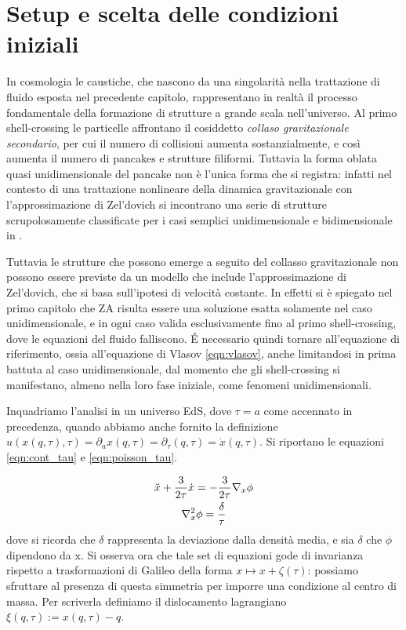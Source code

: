 \begin{comment}
    alcune idee/frasi da inserire


\end{comment}



\section{Setup e scelta delle condizioni iniziali}

In cosmologia le caustiche, che nascono da una singolarità nella trattazione di fluido esposta nel precedente
capitolo, rappresentano in realtà il processo fondamentale della formazione di strutture a grande scala 
nell'universo. Al primo shell-crossing le particelle affrontano il cosiddetto \textit{collaso gravitazionale
secondario}, per cui il numero di collisioni aumenta sostanzialmente, e così aumenta il numero di pancakes e 
strutture filiformi. Tuttavia la forma oblata quasi unidimensionale del pancake non è l'unica forma che si 
registra: infatti nel contesto di una trattazione nonlineare della dinamica gravitazionale con l'approssimazione
di Zel'dovich si incontrano una serie di strutture scrupolosamente classificate per i casi semplici unidimensionale
e bidimensionale in \cite{arnold}.

Tuttavia le strutture che possono emerge a seguito del collasso gravitazionale non possono essere previste 
da un modello che include l'approssimazione di Zel'dovich, che si basa sull'ipotesi di velocità costante.
In effetti si è spiegato nel primo capitolo che ZA risulta essere una soluzione esatta solamente nel caso 
unidimensionale, e in ogni caso valida esclusivamente fino al primo shell-crossing, dove le equazioni del
fluido falliscono. \'E necessario quindi tornare all'equazione di riferimento, ossia all'equazione di Vlasov 
\ref{eqn:vlasov}, anche limitandosi in prima battuta al caso unidimensionale, dal momento che gli 
shell-crossing si manifestano, almeno nella loro fase iniziale, come fenomeni unidimensionali.

Inquadriamo l'analisi in un universo EdS, dove $\tau = a$ come accennato in precedenza, quando abbiamo anche
fornito la definizione $u(x(q, \tau), \tau) = \partial_a x(q, \tau) = \partial_{\tau}(q, \tau) = \dot{x}(q, \tau)$.
Si riportano le equazioni \ref{eqn:cont_tau} e \ref{eqn:poisson_tau}.

\begin{gather}
    \label{eqn:cont_new}
    \ddot{x} + \frac{3}{2\tau}\dot{x} = - \frac{3}{2\tau}\nabla_x \phi \\
    \label{eqn:poisson_new}
    \laplacian_x\phi = \frac{\delta}{\tau}
\end{gather}
dove si ricorda che $\delta$ rappresenta la deviazione dalla densità media, e sia $\delta$
che $\phi$ dipendono da x.
Si osserva ora che tale set di equazioni gode di invarianza rispetto a trasformazioni di 
Galileo della forma $x \mapsto x + \zeta(\tau)$: possiamo sfruttare al presenza di questa 
simmetria per imporre una condizione al centro di massa. Per scriverla definiamo il dislocamento
lagrangiano $\xi(q, \tau):= x(q, \tau) - q$.

